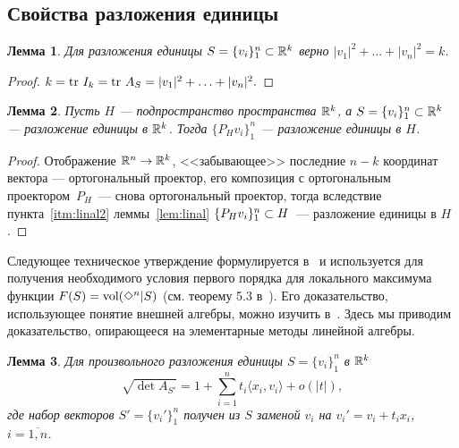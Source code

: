 \documentclass[a4paper,12pt]{article}
\def\vol{\mathop{\rm vol}}
\newcommand{\crosp}{\Diamond}
\newcommand{\lb}[1]{#1\nobreak\discretionary{}{\hbox{\ensuremath{#1}}}{}}
\newtheorem{lem}{Лемма}[section]
\numberwithin{equation}{section}
\begin{document}
	\subsection{Свойства разложения единицы}
	\begin{lem}
		Для разложения единицы $S=\{v_i\}_1^n\subset\mathbb {R}^k$ верно $|v_1|^2+\ldots+|v_n|^2=k$.
	\end{lem}
	\begin{proof} $k=\tr\ I_k=\tr\ A_S=|v_1|^2+\ldots+|v_n|^2.$
	\end{proof}
	\begin{lem}
		Пусть $H$ --- подпространство пространства $\mathbb {R}^k$, а $S=\{v_i\}_1^n\subset\mathbb {R}^k$ --- разложение единицы в $\mathbb {R}^k$. Тогда $\{P_H v_i\}_1^n$ --- разложение единицы в $H$.
	\end{lem}
	\begin{proof}
	Отображение $\mathbb {R}^n\to\mathbb {R}^k$, <<забывающее>> последние $n-k$ координат вектора --- ортогональный проектор, его композиция с ортогональным проектором~$P_H$~--- снова ортогональный проектор, тогда вследствие пункта~\ref{itm:linal2} леммы~\ref{lem:linal} $\{P_Hv_i\}_1^n\lb\subset H$~--- разложение единицы в $H$.
	\end{proof}
	Следующее техническое утверждение формулируется в~\cite{crospol} и используется для получения необходимого условия первого порядка для локального максимума функции $F(S)=\vol(\crosp^n|S)$ (см. теорему 5.3 в~\cite{crospol}). Его доказательство, использующее понятие внешней алгебры, можно изучить в~\cite{zonotop}. Здесь мы приводим доказательство, опирающееся на элементарные методы линейной алгебры.
	\begin{lem}\label{lem:techlem}
		Для произвольного разложения единицы $S=\{v_i\}_1^n$ в $\mathbb {R}^k$
			\begin{equation}
				\sqrt{\det A_{S'}}=1+\sum_{i=1}^n t_i \langle x_i,v_i \rangle + o(|t|), 
			\end{equation}
		где набор векторов $S'=\{v_i'\}_1^n$ получен из $S$ заменой $v_i$ на $v_i'=v_i+t_ix_i$, $i=\overline{1,n}$.
	\end{lem}
\end{document}
